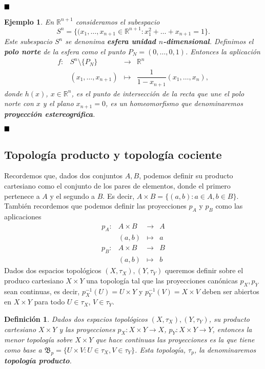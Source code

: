 \documentclass[12pt]{article}
\newtheorem{definition}[theorem]{Definición}
\newtheorem{example}{Ejemplo}[theorem]
\begin{document}
$\hfill \blacksquare$

\begin{example}En $\mathbb{R}^{n+1}$ consideramos el subespacio $$S^n = \lbrace (x_1, \ldots, x_{n+1} \in \mathbb{R}^{n+1}:x_1^2+\ldots +x_{n+1}=1\rbrace.$$ Este subespacio $S^n$ se denonima \textbf{esfera unidad $n$-dimensional}. Definimos el \textbf{polo norte} de la esfera como el punto $P_N = (0, \ldots, 0, 1)$. Entonces la aplicación $$
\begin{array}{rccl}
f\colon &S^n\setminus \lbrace P_N \rbrace& \longrightarrow & \mathbb{R}^n\\
&(x_1, \ldots, x_{n+1})& \longmapsto &\dfrac{1}{1-x_{n+1}}(x_1,  \ldots, x_n), 
\end{array}
$$donde $h(x)$, $x \in \mathbb{R}^n$, es el punto de intersección de la recta que une el polo norte con $x$ y el plano $x_{n+1}=0$, es un homeomorfismo que denominaremos \textbf{proyección estereográfica}.
\end{example}

$\hfill \blacksquare$

\subsection{Topología producto y topología cociente}
Recordemos que, dados dos conjuntos $A,B$, podemos definir su producto cartesiano como el conjunto de los pares de elementos, donde el primero pertenece a $A$ y el segundo a $B$. Es decir, $A \times B = \lbrace (a,b): a \in A, b \in B \rbrace$. También recordemos que podemos definir las proyecciones $p_A$ y $p_B$ como las aplicaciones $$
\begin{array}{rccl}
p_A\colon &A\times B& \longrightarrow & A\\
&(a,b)& \longmapsto &a
\end{array}
$$ $$
\begin{array}{rccl}
p_B\colon &A\times B& \longrightarrow & B\\
&(a,b)& \longmapsto &b
\end{array}
$$ 
Dados dos espacios topológicos $(X, \tau_X), (Y, \tau_Y)$ queremos definir sobre el produco cartesiano $X \times Y$ una topología tal que las proyecciones canónicas $p_X, p_Y$ sean continuas, es decir, $p_X^{-1}(U) = U \times Y$ y $p_Y^{-1}(V) = X \times V$ deben ser abiertos en $X \times Y$ para todo $U \in \tau_X$, $V \in \tau_Y$.

\begin{definition}Dados dos espacios topológicos $(X, \tau_X), (Y, \tau_Y)$, su producto cartesiano $X \times Y$ y las proyecciones $p_X \colon X \times Y \longrightarrow X$, $p_Y \colon X\times Y \longrightarrow Y$, entonces la menor topología sobre $X \times Y$ que hace continuas las proyecciones es la que tiene como base a $\mathfrak{B}_p = \lbrace U \times V: U \in \tau_X, V \in \tau_Y \rbrace$. Esta topología, $\tau_p$, la denominaremos \textbf{topología producto}. 
\end{definition}
\end{document}
